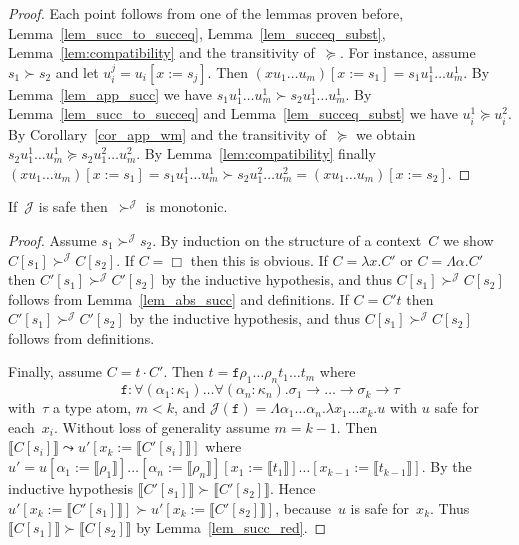 \documentclass[a4paper,UKenglish,cleveref,autoref,numberwithinsect]{lipics-v2019}
\theoremstyle{definition}
\newcommand{\arrtype}{\rightarrow}
\newcommand{\app}[2]{#1 \cdot #2}
\newcommand{\subst}[2]{#1:=#2}
\newcommand{\abs}[2]{\lambda #1.#2}
\newcommand{\tabs}[2]{\Lambda #1.#2}
\newcommand{\typeinterpret}[1]{\llbracket #1 \rrbracket}
\newcommand{\interpret}[1]{\llbracket #1 \rrbracket}
\newcommand{\Termmap}{\mathcal{J}}
\newcommand{\succinterpret}{\succ^{\Termmap}}
\begin{document}
\begin{proof}
  Each point follows from one of the lemmas proven before,
  Lemma~\ref{lem_succ_to_succeq}, Lemma~\ref{lem_succeq_subst},
  Lemma~\ref{lem:compatibility} and the transitivity of~$\succeq$. For
  instance, assume $s_1 \succ s_2$ and let
  $u_i^j=u_i[\subst{x}{s_j}]$. Then $(x u_1 \ldots
  u_m)[\subst{x}{s_1}] = s_1 u_1^1 \ldots u_m^1$. By
  Lemma~\ref{lem_app_succ} we have $s_1 u_1^1 \ldots u_m^1 \succ s_2
  u_1^1 \ldots u_m^1$. By Lemma~\ref{lem_succ_to_succeq} and
  Lemma~\ref{lem_succeq_subst} we have $u_i^1 \succeq u_i^2$. By
  Corollary~\ref{cor_app_wm} and the transitivity of~$\succeq$ we
  obtain $s_2 u_1^1 \ldots u_m^1 \succeq s_2 u_1^2 \ldots u_m^2$. By
  Lemma~\ref{lem:compatibility} finally $(x u_1 \ldots
  u_m)[\subst{x}{s_1}] = s_1 u_1^1 \ldots u_m^1 \succ s_2 u_1^2 \ldots
  u_m^2 = (x u_1 \ldots u_m)[\subst{x}{s_2}]$.
\end{proof}

\begin{lemma}\label{lem_succinterpret_monotonic}
  If~$\Termmap$ is safe then~$\succinterpret$ is monotonic.
\end{lemma}

\begin{proof}
  Assume $s_1 \succinterpret s_2$. By induction on the structure of a
  context~$C$ we show $C[s_1] \succinterpret C[s_2]$. If $C=\Box$ then
  this is obvious. If $C = \abs{x}{C'}$ or $C = \tabs{\alpha}{C'}$
  then $C'[s_1] \succinterpret C'[s_2]$ by the inductive hypothesis,
  and thus $C[s_1] \succinterpret C[s_2]$ follows from
  Lemma~\ref{lem_abs_succ} and definitions. If $C = C' t$ then
  $C'[s_1] \succinterpret C'[s_2]$ by the inductive hypothesis, and
  thus $C[s_1] \succinterpret C[s_2]$ follows from definitions.

  Finally, assume $C = \app{t}{C'}$. Then $t = \mathtt{f} \rho_1
  \ldots \rho_n t_1 \ldots t_m$ where
  \[
  \mathtt{f} : \forall (\alpha_1 : \kappa_1) \ldots \forall (\alpha_n
  : \kappa_n) . \sigma_1 \arrtype \ldots \arrtype \sigma_k \arrtype
  \tau
  \]
  with~$\tau$ a type atom, $m < k$, and $\Termmap(\mathtt{f}) =
  \tabs{\alpha_1 \dots \alpha_n}{\abs{x_1 \dots x_k}{u}}$ with $u$
  safe for each~$x_i$. Without loss of generality assume $m=k-1$. Then
  $\interpret{C[s_i]} \leadsto u'[\subst{x_k}{\interpret{C'[s_i]}}]$
  where
  $u'=u[\subst{\alpha_1}{\typeinterpret{\rho_1}}]\ldots[\subst{\alpha_n}{\typeinterpret{\rho_n}}][\subst{x_1}{\interpret{t_1}}]\ldots[\subst{x_{k-1}}{\interpret{t_{k-1}}}]$. By
  the inductive hypothesis $\interpret{C'[s_1]} \succ
  \interpret{C'[s_2]}$. Hence $u'[\subst{x_k}{\interpret{C'[s_1]}}]
  \succ u'[\subst{x_k}{\interpret{C'[s_2]}}]$, because~$u$ is safe
  for~$x_k$. Thus $\interpret{C[s_1]} \succ \interpret{C[s_2]}$ by
  Lemma~\ref{lem_succ_red}.
\end{proof}
\end{document}
